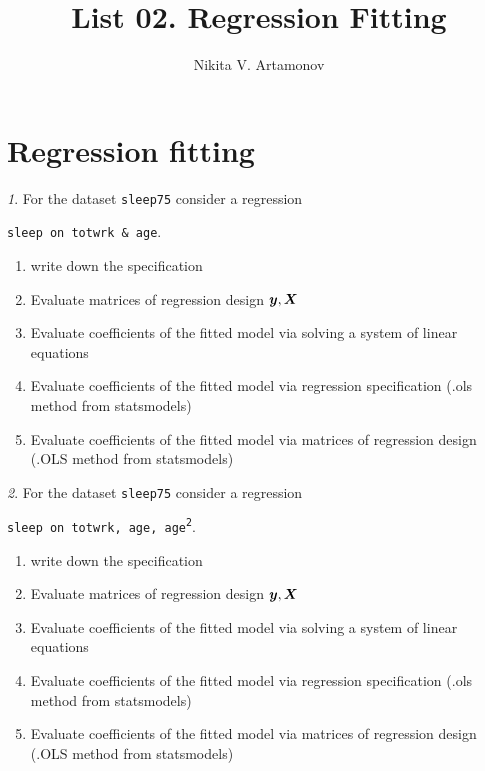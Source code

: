 \documentclass[12pt]{article}
\title{List 02. Regression Fitting}
\author{Nikita V. Artamonov}
\theoremstyle{remark}
\newtheorem{problem}{}[section]
\begin{document}
\maketitle

\tableofcontents

\section{Regression fitting}

\begin{problem}
For the dataset \texttt{sleep75} consider a regression
\begin{center}
	\texttt{sleep on totwrk \& age}.
\end{center}
\begin{enumerate}
	\item write down the specification
	\item Evaluate matrices of regression design \({\bm y}, {\bm X}\)
	\item Evaluate coefficients of the fitted model via 
	solving a system of linear equations
	\item Evaluate coefficients of the fitted model via 
	regression specification (.ols method from statsmodels)
	\item Evaluate coefficients of the fitted model via 
	matrices of regression design (.OLS method from statsmodels)
\end{enumerate}
\end{problem}

\begin{problem}
For the dataset \texttt{sleep75} consider a regression
\begin{center}
	\texttt{sleep on totwrk, age, age\textsuperscript{2}}.
\end{center}
\begin{enumerate}
	\item write down the specification
	\item Evaluate matrices of regression design \({\bm y}, {\bm X}\)
	\item Evaluate coefficients of the fitted model via 
	solving a system of linear equations
	\item Evaluate coefficients of the fitted model via 
	regression specification (.ols method from statsmodels)
	\item Evaluate coefficients of the fitted model via 
	matrices of regression design (.OLS method from statsmodels)
\end{enumerate}
\end{problem}
\end{document}
